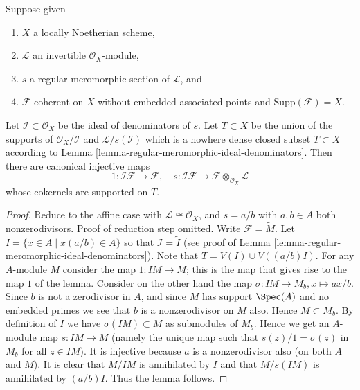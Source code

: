 \begin{lemma}
\label{lemma-make-maps-regular-section}
Suppose given
\begin{enumerate}
\item $X$ a locally Noetherian scheme,
\item $\mathcal{L}$ an invertible $\mathcal{O}_X$-module,
\item $s$ a regular meromorphic section of $\mathcal{L}$, and
\item $\mathcal{F}$ coherent on $X$
without embedded associated points and $\text{Supp}(\mathcal{F}) = X$.
\end{enumerate}
Let $\mathcal{I} \subset \mathcal{O}_X$ be the ideal of
denominators of $s$. Let $T \subset X$ be the union
of the supports of $\mathcal{O}_X/\mathcal{I}$ and
$\mathcal{L}/s(\mathcal{I})$ which is a nowhere dense closed
subset $T \subset X$ according to
Lemma \ref{lemma-regular-meromorphic-ideal-denominators}.
Then there are canonical injective maps
$$
1 : \mathcal{I}\mathcal{F} \to \mathcal{F}, \quad
s : \mathcal{I}\mathcal{F} \to \mathcal{F} \otimes_{\mathcal{O}_X}\mathcal{L}
$$
whose cokernels are supported on $T$.
\end{lemma}

\begin{proof}
Reduce to the affine case with $\mathcal{L} \cong \mathcal{O}_X$,
and $s = a/b$ with $a, b \in A$ both nonzerodivisors.
Proof of reduction step omitted.
Write $\mathcal{F} = \widetilde{M}$.
Let $I = \{x \in A \mid x(a/b) \in A\}$
so that $\mathcal{I} = \widetilde{I}$ (see
proof of Lemma \ref{lemma-regular-meromorphic-ideal-denominators}).
Note that $T = V(I) \cup V((a/b)I)$.
For any $A$-module $M$ consider the map $1 : IM \to M$; this is the
map that gives rise to the map $1$ of the lemma.
Consider on the other hand the map
$\sigma : IM \to M_b, x \mapsto ax/b$.
Since $b$ is not a zerodivisor in $A$, and since
$M$ has support $\Spec(A)$ and no embedded primes we
see that $b$ is a nonzerodivisor on $M$ also. Hence $M \subset M_b$.
By definition of $I$ we have $\sigma(IM) \subset M$ as submodules
of $M_b$. Hence we get an $A$-module map $s : IM \to M$ (namely the
unique map such that $s(z)/1 = \sigma(z)$ in $M_b$ for all $z \in IM$).
It is injective because $a$ is a nonzerodivisor also (on both $A$ and $M$).
It is clear that $M/IM$ is annihilated by $I$ and that
$M/s(IM)$ is annihilated by $(a/b)I$. Thus the lemma follows.
\end{proof}





